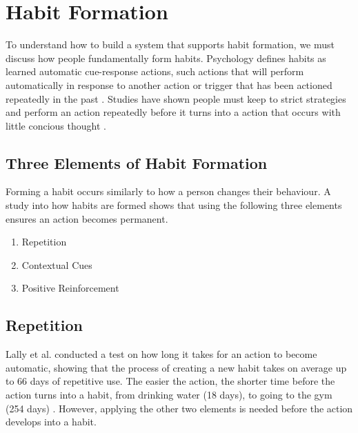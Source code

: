 \newpage

\section{Habit Formation}
To understand how to build a system that supports habit formation, we must discuss how people fundamentally form habits.\newline
\newline
Psychology defines habits as learned automatic cue-response actions, such actions that will perform automatically in response to another action or trigger that has been actioned repeatedly in the past \cite{article_the_habitual_consumer}. Studies have shown people must keep to strict strategies and perform an action repeatedly before it turns into a action that occurs with little concious thought \cite{article_promoting_habit_formation}.

\subsection{Three Elements of Habit Formation}
Forming a habit occurs similarly to how a person changes their behaviour. A study into how habits are formed \cite{article_experiences_of_habit_formation} shows that using the following three elements ensures an action becomes permanent.

\begin{enumerate}
  \item Repetition
  \item Contextual Cues
  \item Positive Reinforcement
\end{enumerate}

\subsection*{Repetition}
Lally et al. \cite{article_how_habits_formed_modelling_habit_formation} conducted a test on how long it takes for an action to become automatic, showing that the process of creating a new habit takes on average up to 66 days of repetitive use. The easier the action, the shorter time before the action turns into a habit, from drinking water (18 days), to going to the gym (254 days) \cite{article_how_habits_formed_modelling_habit_formation}. However, applying the other two elements is needed before the action develops into a habit.

